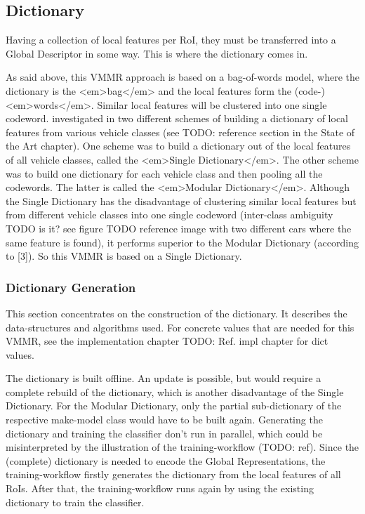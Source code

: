 \subsection{Dictionary}
Having a collection of local features per RoI, they must be transferred into a Global Descriptor in some way. This is where the dictionary comes in.

As said above, this VMMR approach is based on a bag-of-words model, where the dictionary is the <em>bag</em> and the local features form the (code-)<em>words</em>. Similar local features will be clustered into one single codeword. \citeauthor{siddiqui2015robust} \citep{siddiqui2015robust} investigated in two different schemes of building a dictionary of local features from various vehicle classes (see TODO: reference section in the State of the Art chapter). One scheme was to build a dictionary out of the local features of all vehicle classes, called the <em>Single Dictionary</em>. The other scheme was to build one dictionary for each vehicle class and then pooling all the codewords. The latter is called the <em>Modular Dictionary</em>. Although the Single Dictionary has the disadvantage of clustering similar local features but from different vehicle classes into one single codeword (inter-class ambiguity TODO is it? see figure TODO reference image with two different cars where the same feature is found), it performs superior to the Modular Dictionary (according to [3]). So this VMMR is based on a Single Dictionary.

\subsubsection{Dictionary Generation}
This section concentrates on the construction of the dictionary. It describes the data-structures and algorithms used. For concrete values that are needed for this VMMR, see the implementation chapter TODO: Ref. impl chapter for dict values.

The dictionary is built offline. An update is possible, but would require a complete rebuild of the dictionary, which is another disadvantage of the Single Dictionary. For the Modular Dictionary, only the partial sub-dictionary of the respective make-model class would have to be built again. Generating the dictionary and training the classifier don’t run in parallel, which could be misinterpreted by the illustration of the training-workflow (TODO: ref). Since the (complete) dictionary is needed to encode the Global Representations, the training-workflow firstly generates the dictionary from the local features of all RoIs. After that, the training-workflow runs again by using the existing dictionary to train the classifier.











